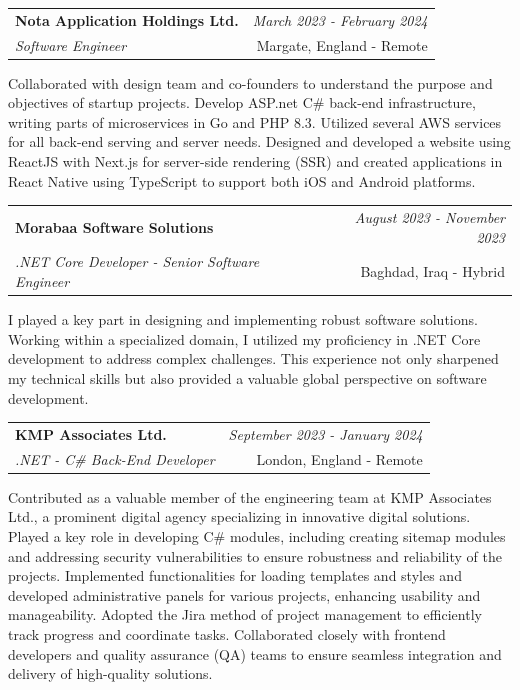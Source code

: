 \documentclass[a4paper,10pt]{article}
\makeatletter
\newcommand{\resumeSubheading}[4]{
	\vspace{0.5mm}\item
	\begin{tabular*}{0.98\textwidth}[t]{l@{\extracolsep{\fill}}r}
		\textbf{#1} & \textit{\footnotesize{#4}} \\
		\textit{\footnotesize{#3}} &  \footnotesize{#2}\\
	\end{tabular*}
	\vspace{-2.4mm}
}
\newcommand{\resumeItemListStart}{\begin{justify}\begin{itemize}[leftmargin=3ex, rightmargin=2ex, noitemsep,labelsep=1.2mm,itemsep=0mm]\small}
\newcommand{\resumeItemListEnd}{\end{itemize}\end{justify}\vspace{-2mm}}
\makeatother
\begin{document}
\vspace{-1mm}
\resumeSubheading
{Nota Application Holdings Ltd.}{Margate, England - Remote}
{Software Engineer}{March 2023 - February 2024}
\resumeItemListStart
Collaborated with design team and co-founders to understand the purpose and objectives of startup projects. Develop ASP.net C\# back-end infrastructure, writing parts of microservices in Go and PHP 8.3. Utilized several AWS services for all back-end serving and server needs. Designed and developed a website using ReactJS with Next.js for server-side rendering (SSR) and created applications in React Native using TypeScript to support both iOS and Android platforms.
\resumeItemListEnd

\vspace{-1mm}
\resumeSubheading
{Morabaa Software Solutions}{Baghdad, Iraq - Hybrid}
{.NET Core Developer - Senior Software Engineer}{August 2023 - November 2023}
\resumeItemListStart
I played a key part in designing and implementing robust software solutions. Working within a specialized domain, I utilized my proficiency in .NET Core development to address complex challenges. This experience not only sharpened my technical skills but also provided a valuable global perspective on software development.
\resumeItemListEnd

\vspace{-1mm}
\resumeSubheading
{KMP Associates Ltd.}{London, England - Remote}
{.NET - C\# Back-End Developer}{September 2023 - January 2024}
\resumeItemListStart
Contributed as a valuable member of the engineering team at KMP Associates Ltd., a prominent digital agency specializing in innovative digital solutions. Played a key role in developing C\# modules, including creating sitemap modules and addressing security vulnerabilities to ensure robustness and reliability of the projects. Implemented functionalities for loading templates and styles and developed administrative panels for various projects, enhancing usability and manageability. Adopted the Jira method of project management to efficiently track progress and coordinate tasks. Collaborated closely with frontend developers and quality assurance (QA) teams to ensure seamless integration and delivery of high-quality solutions.
\resumeItemListEnd
\end{document}
